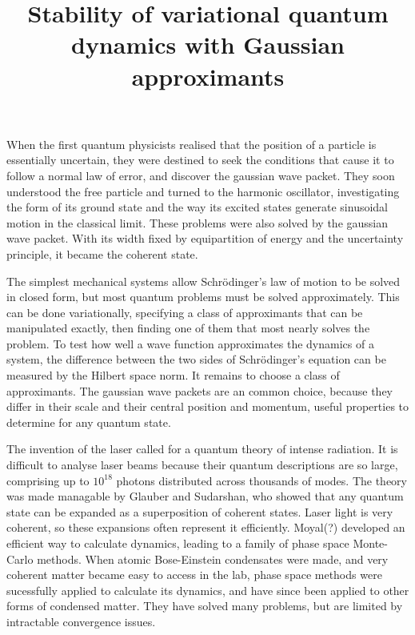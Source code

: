 \nonstopmode




\title{Stability of variational quantum dynamics with Gaussian approximants}

\def\G{|Γ〉}
\def\cite#1{$[\hbox{\tt #1}]$}


When the first quantum physicists realised that the position of a particle is essentially uncertain, they were destined to seek the conditions that cause it to follow a normal law of error, and discover the gaussian wave packet.  They soon understood the free particle and turned to the harmonic oscillator, investigating the form of its ground state and the way its excited states generate sinusoidal motion in the classical limit.  These problems were also solved by the gaussian wave packet.  With its width fixed by equipartition of energy and the uncertainty principle, it became the coherent state.

The simplest mechanical systems allow Schrödinger's law of motion to be solved in closed form, but most quantum problems must be solved approximately.  This can be done variationally, specifying a class of approximants that can be manipulated exactly, then finding one of them that most nearly solves the problem.  To test how well a wave function approximates the dynamics of a system, the difference between the two sides of Schrödinger's equation can be measured by the Hilbert space norm.  It remains to choose a class of approximants.  The gaussian wave packets are an common choice, because they differ in their scale and their central position and momentum, useful properties to determine for any quantum state.

The invention of the laser called for a quantum theory of intense radiation.  It is difficult to analyse laser beams because their quantum descriptions are so large, comprising up to $10^{18}$ photons distributed across thousands of modes.  The theory was made managable by Glauber and Sudarshan, who showed that any quantum state can be expanded as a superposition of coherent states.  Laser light is very coherent, so these expansions often represent it efficiently.  Moyal(?) developed an efficient way to calculate dynamics, leading to a family of phase space Monte-Carlo methods.  When atomic Bose-Einstein condensates were made, and very coherent matter became easy to access in the lab, phase space methods were sucessfully applied to calculate its dynamics, and have since been applied to other forms of condensed matter.  They have solved many problems, but are limited by intractable convergence issues.

